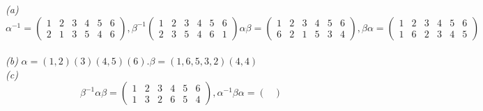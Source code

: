 \documentclass[11pt]{article}
\newenvironment{problem}[2][Problem]{\begin{trivlist}
\item[\hskip \labelsep {\bfseries #1}\hskip \labelsep {\bfseries #2.}]}{\end{trivlist}}
\begin{document}
\begin{problem}{(2)}
\textit{(a)} \[ \alpha^{-1} =  \begin{pmatrix} 1&2&3&4&5&6 \\ 2&1&3&5&4&6  \end{pmatrix} , \beta^{-1} \begin{pmatrix} 1&2&3&4&5&6 \\ 2&3&5&4&6&1  \end{pmatrix}
\alpha \beta = \begin{pmatrix} 1&2&3&4&5&6 \\ 6&2&1&5&3&4\end{pmatrix}, \beta \alpha = \begin{pmatrix} 1&2&3&4&5&6 \\ 1&6&2&3&4&5 \end{pmatrix}\]\\
\textit{(b)} $\alpha = (1,2)(3)(4,5)(6). \beta = (1,6,5,3,2)(4,4)$\\
\textit{(c)} \[ \beta^{-1} \alpha \beta = \begin{pmatrix} 1&2&3&4&5&6\\ 1&3&2&6&5&4 \end{pmatrix}, \alpha^{-1}\beta \alpha = 
\begin{pmatrix}  \end{pmatrix}\]
\end{problem}
\end{document}

